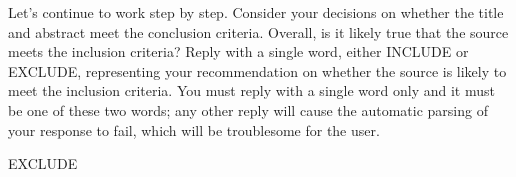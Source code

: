 \documentclass{article}
\begin{document}
\begin{description}
  \System Let's continue to work step by step. Consider your decisions on
  whether the title and abstract meet the conclusion criteria. Overall, is it
  likely true that the source meets the inclusion criteria? Reply with a single
  word, either INCLUDE or EXCLUDE, representing your recommendation on whether
  the source is likely to meet the inclusion criteria. You must reply with a
  single word only and it must be one of these two words; any other reply will
  cause the automatic parsing of your response to fail, which will be
  troublesome for the user.

  \GPT EXCLUDE

\end{description}
\end{document}
